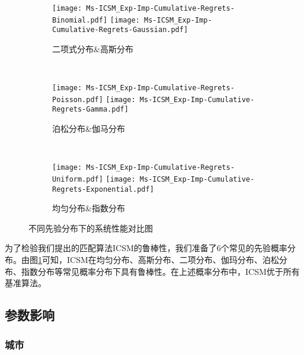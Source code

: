 \begin{figure}[!htb]
	\centering
	\begin{subfigure}[t]{0.99\linewidth}
		\captionsetup{justification=centering} %
		\begin{minipage}[b]{1\linewidth}
			\texttt{[image: Ms-ICSM\_Exp-Imp-Cumulative-Regrets-Binomial.pdf]}
			\texttt{[image: Ms-ICSM\_Exp-Imp-Cumulative-Regrets-Gaussian.pdf]}
			\caption{二项式分布\&高斯分布}
		\end{minipage}
	\end{subfigure}\\	
	\begin{subfigure}[t]{0.99\linewidth}
		\captionsetup{justification=centering} %
		\begin{minipage}[b]{1\linewidth}
			\texttt{[image: Ms-ICSM\_Exp-Imp-Cumulative-Regrets-Poisson.pdf]}
			\texttt{[image: Ms-ICSM\_Exp-Imp-Cumulative-Regrets-Gamma.pdf]}
			\caption{泊松分布\&伽马分布}
		\end{minipage}
	\end{subfigure}\\
	\begin{subfigure}[t]{0.99\linewidth}
		\captionsetup{justification=centering} %
		\begin{minipage}[b]{1\linewidth}
			\texttt{[image: Ms-ICSM\_Exp-Imp-Cumulative-Regrets-Uniform.pdf]}
			\texttt{[image: Ms-ICSM\_Exp-Imp-Cumulative-Regrets-Exponential.pdf]}
			\caption{均匀分布\&指数分布}
		\end{minipage}
	\end{subfigure}
	\caption{不同先验分布下的系统性能对比图}
	\label{Fig:Exp-Imp-Cumulative-Regrets}
\end{figure}
为了检验我们提出的匹配算法ICSM的鲁棒性，我们准备了6个常见的先验概率分布。由图\ref{Fig:Exp-Imp-Cumulative-Regrets}可知，ICSM在均匀分布、高斯分布、二项分布、伽玛分布、泊松分布、指数分布等常见概率分布下具有鲁棒性。在上述概率分布中，ICSM优于所有基准算法。



\subsection{参数影响}
\subsubsection{城市}


